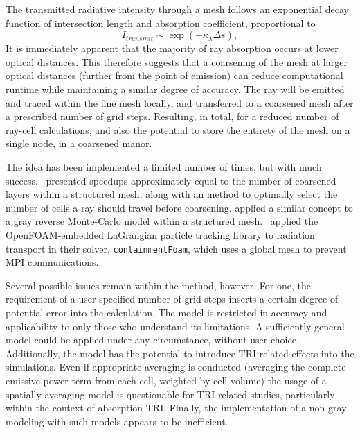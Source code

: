 The transmitted radiative intensity through a mesh follows an exponential decay function of intersection length and absorption coefficient, proportional to
\begin{equation}
     I_{transmit} \sim \exp{\left(-\kappa{}_\lambda{}\Delta{s}\right)},
    \label{eq:specular_reflection}
\end{equation}
It is immediately apparent that the majority of ray absorption occurs at lower optical distances. This therefore suggests that a coarsening of the mesh at larger optical distances (further from the point of emission) can reduce computational runtime while maintaining a similar degree of accuracy.
The ray will be emitted and traced within the fine mesh locally, and transferred to a coarsened mesh after a prescribed number of grid steps.
Resulting, in total, for a reduced number of ray-cell calculations, and also the potential to store the entirety of the mesh on a single node, in a coarsened manor. 

The idea has been implemented a limited number of times, but with much success.~\citet{Silvestri2019ASimulation} presented speedups approximately equal to the number of coarsened layers within a structured mesh, along with an method to optimally select the number of cells a ray should travel before coarsening. 
\citet{Humphrey2015ATracing} applied a similar concept to a gray reverse Monte-Carlo model within a structured mesh.~\citet{Kelm2021TheTransport} applied the OpenFOAM-embedded LaGrangian particle tracking library to radiation transport in their solver, \verb|containmentFoam|, which uses a global mesh to prevent MPI communications.

Several possible issues remain within the method, however. For one, the requirement of a user specified number of grid steps inserts a certain degree of potential error into the calculation. 
The model is restricted in accuracy and applicability to only those who understand its limitations. A sufficiently general model could be applied under any circumstance, without user choice.
Additionally, the model has the potential to introduce TRI-related effects into the simulations. 
Even if appropriate averaging is conducted (averaging the complete emissive power term from each cell, weighted by cell volume) the usage of a spatially-averaging model is questionable for TRI-related studies, particularly within the context of absorption-TRI.
Finally, the implementation of a non-gray modeling with such models appears to be inefficient.



